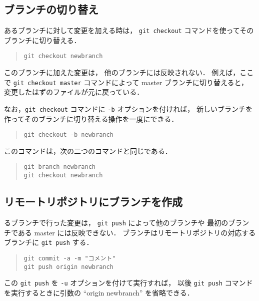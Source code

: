 \documentclass[a4j,10pt]{jarticle}
\begin{document}
\subsection{ブランチの切り替え}
あるブランチに対して変更を加える時は，
\verb|git checkout| コマンドを使ってそのブランチに切り替える．

\begin{quote}
\begin{verbatim}
git checkout newbranch
\end{verbatim}
\end{quote}

このブランチに加えた変更は，
他のブランチには反映されない．
例えば，ここで \verb|git checkout master| コマンドによって
master ブランチに切り替えると，
変更したはずのファイルが元に戻っている．

なお，\verb|git checkout| コマンドに \verb|-b| オプションを付ければ，
新しいブランチを作ってそのブランチに切り替える操作を一度にできる．

\begin{quote}
\begin{verbatim}
git checkout -b newbranch
\end{verbatim}
\end{quote}

このコマンドは，次の二つのコマンドと同じである．

\begin{quote}
\begin{verbatim}
git branch newbranch
git checkout newbranch
\end{verbatim}
\end{quote}

\subsection{リモートリポジトリにブランチを作成}
るブランチで行った変更は，
\verb|git push| によって他のブランチや
最初のブランチである master には反映できない．
ブランチはリモートリポジトリの対応するブランチに \verb|git push| する．

\begin{quote}
\begin{verbatim}
git commit -a -m "コメント"
git push origin newbranch
\end{verbatim}
\end{quote}

この \verb|git push| を \verb|-u| オプションを付けて実行すれば，
以後 \verb|git push| コマンドを実行するときに引数の
``origin newbranch'' を省略できる．
\end{document}
